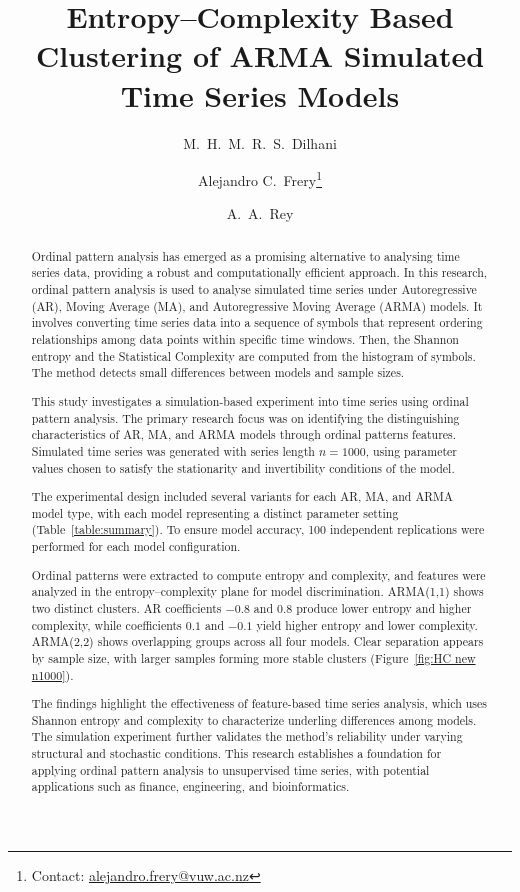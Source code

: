 \documentclass[11pt,a4paper]{article}
\title{\vspace{-1cm}Entropy–Complexity Based Clustering of ARMA Simulated Time Series Models\vspace{-0.3cm}}
\author[1]{M.\ H.\ M.\ R.\ S.\ Dilhani}
\author[1]{Alejandro C.\ Frery\thanks{Contact: \href{mailto:alejandro.frery@vuw.ac.nz}{alejandro.frery@vuw.ac.nz}}}
\author[2]{A.\ A.\ Rey}
\affil[1]{School of Mathematics and Statistics, Victoria University of Wellington, New Zealand}
\affil[2]{Laboratorio de Investigación y Desarrollo Experimental en Computación (LIDEC),\\
	Instituto de Tecnología e Ingeniería, Universidad Nacional de Hurlingham (UNAHUR), Argentina}
\date{}
\begin{document}
	\maketitle
	\vspace{-0.5cm}
	
	\begin{abstract}
		
				
		Ordinal pattern analysis has emerged as a promising alternative to analysing time series data, providing a robust and computationally efficient approach. In this research, ordinal pattern analysis is used to analyse simulated time series under Autoregressive (AR), Moving Average (MA), and Autoregressive Moving Average (ARMA) models. It involves converting time series data into a sequence of symbols that represent ordering relationships among data points within specific time windows. Then, the Shannon entropy and the Statistical Complexity are computed from the histogram of symbols. The method detects small differences between models and sample sizes.
		
		This study investigates a simulation-based experiment into time series using ordinal pattern analysis. The primary research focus was on identifying the distinguishing characteristics of AR, MA, and ARMA models through ordinal patterns features. Simulated time series was generated with series length $n = 1000$, using parameter values chosen to satisfy the stationarity and invertibility conditions of the model.
		
		The experimental design included several variants for each AR, MA, and ARMA model type, with each model representing a distinct parameter setting (Table~\ref{table:summary}). To ensure model accuracy, 100 independent replications were performed for each model configuration.
		
		Ordinal patterns were extracted to compute entropy and complexity, and features were analyzed in the entropy–complexity plane for model discrimination. ARMA(1,1) shows two distinct clusters. AR coefficients $-0.8$ and $0.8$ produce lower entropy and higher complexity, while coefficients $0.1$ and $-0.1$ yield higher entropy and lower complexity. ARMA(2,2) shows overlapping groups across all four models. Clear separation appears by sample size, with larger samples forming more stable clusters (Figure~\ref{fig:HC new n1000}).
		
		The findings highlight the effectiveness of feature-based time series analysis, which uses Shannon entropy and complexity to characterize underling differences among models. The simulation experiment further validates the method’s reliability under varying structural and stochastic conditions. This research establishes a foundation for applying ordinal pattern analysis to unsupervised time series, with potential applications such as finance, engineering, and bioinformatics.
		
	\end{abstract}
	
\end{document}
